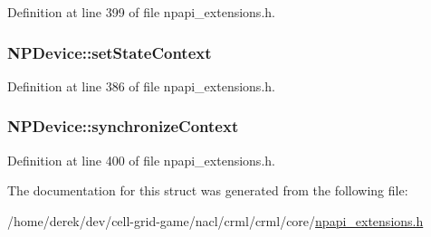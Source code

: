 Definition at line 399 of file npapi\_\-extensions.h.

\hypertarget{struct_n_p_device_aac2938686b27ae8226241777ac3a08e4}{
\subsubsection[{setStateContext}]{ {\bf NPDevice::setStateContext}}}
\label{struct_n_p_device_aac2938686b27ae8226241777ac3a08e4}


Definition at line 386 of file npapi\_\-extensions.h.

\hypertarget{struct_n_p_device_a2ac8d1580ecf9da82b0f7e3ad5b1374e}{
\subsubsection[{synchronizeContext}]{ {\bf NPDevice::synchronizeContext}}}
\label{struct_n_p_device_a2ac8d1580ecf9da82b0f7e3ad5b1374e}


Definition at line 400 of file npapi\_\-extensions.h.



The documentation for this struct was generated from the following file:\begin{DoxyCompactItemize}
\item 
/home/derek/dev/cell-\/grid-\/game/nacl/crml/crml/core/\hyperlink{npapi__extensions_8h}{npapi\_\-extensions.h}\end{DoxyCompactItemize}
